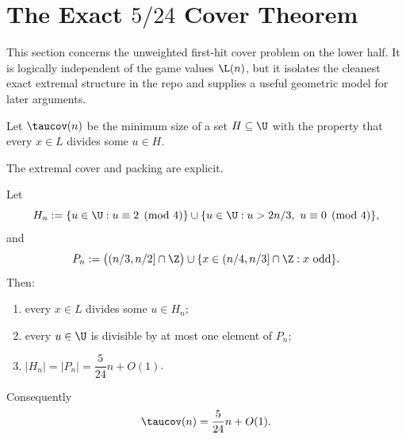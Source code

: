 
\section{The Exact \texorpdfstring{$5/24$}{5/24} Cover Theorem}\label{sec:524-cover}

This section concerns the unweighted first-hit cover problem on the lower half.
It is logically independent of the game values $\L(n)$, but it isolates the
cleanest exact extremal structure in the repo and supplies a useful geometric
model for later arguments.

\begin{definition}
Let $\taucov(n)$ be the minimum size of a set $H \subseteq \U$ with the
property that every $x \in L$ divides some $u \in H$.
\end{definition}

The extremal cover and packing are explicit.

\begin{theorem}\label{thm:524-cover}
Let
\[
  H_n
  :=
  \{u \in \U : u \equiv 2 \pmod 4\}
  \cup
  \{u \in \U : u > 2n/3,\ u \equiv 0 \pmod 4\},
\]
and
\[
  P_n
  :=
  \big((n/3,n/2]\cap\Z\big)
  \cup
  \{x \in (n/4,n/3]\cap\Z : x \text{ odd}\}.
\]
Then:
\begin{enumerate}
  \item every $x \in L$ divides some $u \in H_n$;
  \item every $u \in \U$ is divisible by at most one element of $P_n$;
  \item $|H_n| = |P_n| = \dfrac{5}{24}n + O(1)$.
\end{enumerate}
Consequently
\[
  \taucov(n) = \frac{5}{24}n + O(1).
\]
\end{theorem}

